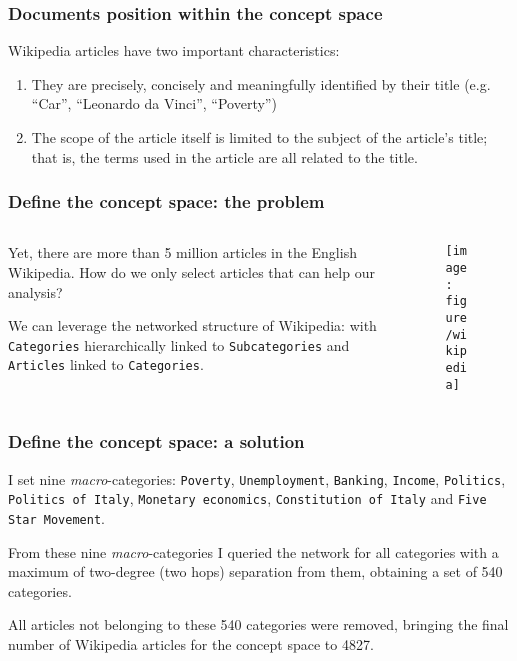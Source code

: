 \documentclass[serif, aspectratio=169]{beamer}
\begin{document}
\begin{frame}
\frametitle{Documents position within the concept space}

Wikipedia articles have two important characteristics:
 
\begin{enumerate}

\item They are precisely, concisely and meaningfully identified by their title (e.g. ``Car'', ``Leonardo da Vinci'', ``Poverty'')

\item The scope of the article itself is limited to the subject of the article's title; that is, the terms used in the article are all related to the title. 

\end{enumerate} 

\end{frame}

\begin{frame}
\frametitle{Define the concept space: the problem}

\begin{columns}
\begin{column}{0.4\textwidth}
Yet, there are more than 5 million articles in the English Wikipedia. How do we only select articles that can help our analysis?

We can leverage the networked structure of Wikipedia: with \texttt{Categories} hierarchically linked to \texttt{Subcategories} and \texttt{Articles} linked to \texttt{Categories}.
\end{column}
\begin{column}{0.6\textwidth}
\begin{figure}
    \texttt{[image: figure/wikipedia]}
\end{figure}
\end{column}
\end{columns}
\end{frame}


\begin{frame}
\frametitle{Define the concept space: a solution}



I set nine \textit{macro}-categories: \texttt{Poverty}, \texttt{Unemployment}, \texttt{Banking}, \texttt{Income}, \texttt{Politics}, \texttt{Politics of Italy}, \texttt{Monetary economics}, \texttt{Constitution of Italy} and \texttt{Five Star Movement}.

From these nine \textit{macro}-categories I queried the network for all categories with a maximum of two-degree (two hops) separation from them, obtaining a set of 540 categories.

All articles not belonging to these 540 categories were removed, bringing the final number of Wikipedia articles for the concept space to 4827.
\end{frame}
\end{document}
